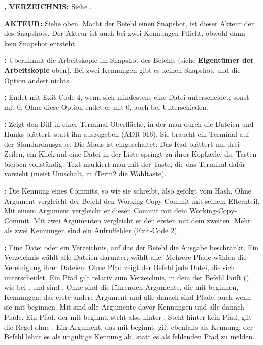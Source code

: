 \startitemize
\item {\bf {},  VERZEICHNIS:} Siehe .
\item {\bf {} AKTEUR:} Siehe oben. Macht der Befehl einen Snapshot,
ist dieser Akteur der des Snapshots. Der Akteur ist auch bei zwei Kennungen Pflicht, obwohl
dann kein Snapshot entsteht.
\item {\bf {}:} Übernimmt die Arbeitskopie im Snapshot des Befehls
(siehe {\bf Eigentümer der Arbeitskopie} oben). Bei zwei Kennungen gibt es keinen Snapshot,
und die Option ändert nichts.
\item {\bf {}:} Endet mit Exit-Code 4, wenn sich mindestens eine Datei
unterscheidet; sonst mit 0. Ohne diese Option endet er mit 0, auch bei Unterschieden.
\item {\bf {}:} Zeigt den Diff in einer Terminal-Oberfläche, in der man durch
die Dateien und Hunks blättert, statt ihn auszugeben (ADR-016). Sie braucht ein Terminal
auf der Standardausgabe.
Die Maus ist eingeschaltet: Das Rad blättert um drei Zeilen, ein Klick auf eine Datei in der
Liste springt zu ihrer Kopfzeile; die Tasten bleiben vollständig. Text markiert man mit der
Taste, die das Terminal dafür vorsieht (meist Umschalt, in iTerm2 die Wahltaste).
\item {\bf {}:} Die Kennung eines Commits, so wie  sie schreibt,
also  gefolgt vom Hash. Ohne Argument vergleicht der Befehl den Working-Copy-Commit
mit seinem Elternteil. Mit einem Argument vergleicht er diesen Commit mit dem
Working-Copy-Commit. Mit zwei Argumenten vergleicht er den ersten mit dem zweiten.
Mehr als zwei Kennungen sind ein Aufruffehler (Exit-Code 2).
\item {\bf {}:} Eine Datei oder ein Verzeichnis, auf das der Befehl die Ausgabe
beschränkt. Ein Verzeichnis wählt alle Dateien darunter;  wählt alle. Mehrere Pfade
wählen die Vereinigung ihrer Dateien. Ohne Pfad zeigt der Befehl jede Datei, die sich
unterscheidet. Ein Pfad gilt relativ zum Verzeichnis, in dem der Befehl läuft (), wie
bei ;  und  sind . Ohne \type{--} sind die führenden
Argumente, die mit  beginnen, Kennungen; das erste andere Argument und alle danach
sind Pfade, auch wenn sie mit  beginnen. Mit \type{--} sind alle Argumente davor
Kennungen und alle danach Pfade. Ein Pfad, der mit  beginnt, steht also hinter
\type{--}. Steht hinter \type{--} kein Pfad, gilt die Regel ohne \type{--}.
Ein Argument, das mit  beginnt, gilt ebenfalls als Kennung;
der Befehl lehnt es als ungültige Kennung ab, statt es als fehlenden Pfad zu melden.
\stopitemize

